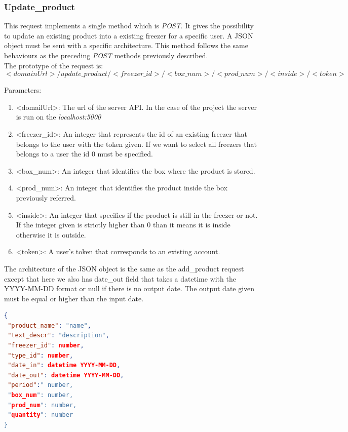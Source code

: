 \subsubsection{Update\_product}
This request implements a single method which is \textit{POST}. It gives the possibility to update an existing product into a existing freezer for a specific user. A JSON object must be sent with a specific architecture. This method follows the same behaviours as the preceding \textit{POST} methods previously described.\\

The prototype of the request is:
$$<domainUrl>/update\_product/<freezer\_id>/<box\_num>/<prod\_num>/<inside>/<token>$$

Parameters:
\begin{enumerate}
\item <domailUrl>: The url of the server API. In the case of the project the server is run on the \textit{localhost:5000}
\item <freezer\_id>: An integer that represents the id of an existing freezer that belongs to the user with the token given. If we want to select all freezers that belongs to a user the id 0 must be specified.
\item <box\_num>: An integer that identifies the box where the product is stored.
\item <prod\_num>: An integer that identifies the product inside the box previously referred.
\item <inside>: An integer that specifies if the product is still in the freezer or not. If the integer given is strictly higher than 0 than it means it is inside otherwise it is outside.
\item <token>: A user's token that corresponds to an existing account.
\end{enumerate}

The architecture of the JSON object is the same as the add\_product request except that here we also has date\_out field that takes a datetime with the YYYY-MM-DD format or null if there is no output date. The output date given must be equal or higher than the input date.
\begin{lstlisting}[language=json]
{
 "product_name": "name",
 "text_descr": "description",
 "freezer_id": number,
 "type_id": number,
 "date_in": datetime YYYY-MM-DD,
 "date_out": datetime YYYY-MM-DD,
 "period":" number,
 "box_num": number,
 "prod_num": number,
 "quantity": number
}
\end{lstlisting}

